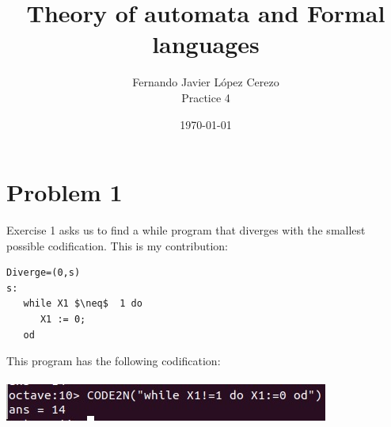 \documentclass{article}
\title{Theory of automata and Formal languages}
\author{Fernando Javier López Cerezo \\ Practice 4}
\date{\today}
\begin{document}
\maketitle

\section*{Problem 1}
Exercise 1 asks us to find a while program that diverges with the smallest possible codification. This is my contribution: \begin{lstlisting}
Diverge=(0,s)
s:
   while X1 $\neq$  1 do
      X1 := 0;
   od
\end{lstlisting}
This program has the following codification: \\\\ \includegraphics[width=\linewidth]{diverge.png}
\end{document}
